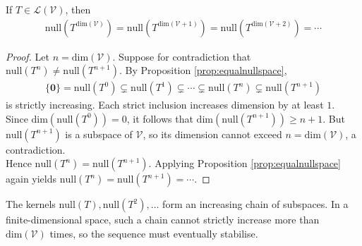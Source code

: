 \begin{proposition} \label{prop:equalnullspacedimv} If $T \in \mathcal{L}(\mathcal{V})$, then
\begin{align}
\text{null}(T^{\text{dim}(\mathcal{V})}) = \text{null}(T^{\text{dim}(\mathcal{V} + 1)}) = \text{null}(T^{\text{dim}(\mathcal{V}+2)}) = \cdots \nonumber
\end{align}
\begin{proof} Let $n = \text{dim}(\mathcal{V})$. Suppose for contradiction that $\text{null}(T^n) \neq \text{null}(T^{n+1})$. By Proposition \ref{prop:equalnullspace},
\begin{align}
\{ \mathbf{0} \} = \text{null}(T^0) \subsetneq \text{null}(T^1) \subsetneq \cdots \subsetneq \text{null}(T^n) \subsetneq \text{null}(T^{n+1}) \nonumber
\end{align}
is strictly increasing. Each strict inclusion increases dimension by at least $1$. \\
Since $\text{dim}(\text{null}(T^0)) = 0$, it follows that $\text{dim}(\text{null}(T^{n+1})) \geq n+1$. But $\text{null}(T^{n+1})$ is a subspace of $\mathcal{V}$, so its dimension cannot exceed $n = \text{dim}(\mathcal{V})$, a contradiction.\\
Hence $\text{null}(T^{n}) = \text{null}(T^{n+1})$. Applying Proposition \ref{prop:equalnullspace} again yields $\text{null}(T^{n}) = \text{null}(T^{n+1}) = \cdots$.
\end{proof}
\end{proposition}

The kernels $\text{null}(T), \text{null}(T^2), \ldots$ form an increasing chain of subspaces. In a finite-dimensional space, such a chain cannot strictly increase more than $\text{dim}(\mathcal{V})$ times, so the sequence must eventually stabilise.

